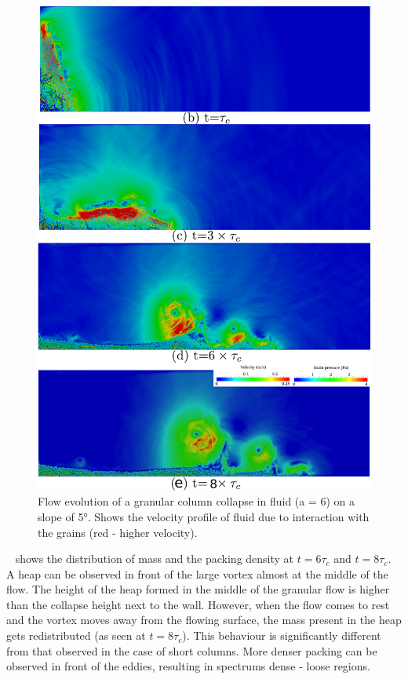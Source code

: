\documentclass[epj,twocolumn]{webofc}
\begin{document}
\begin{figure}[!h]
\centering
\includegraphics[width=0.9\linewidth]{figs/lbm_dem_a6_slope5}
\caption[Flow evolution of a granular column collapse in fluid (a = 6) on a 
slope of 5\si{\degree}]{Flow evolution of a granular column collapse in fluid 
(a = 6) on a slope of 5\si{\degree}. Shows the velocity profile of fluid due to 
interaction with the grains (red - higher velocity).}
\label{fig:a6_slope_snapshots}
\end{figure}

~ shows 
the distribution of mass and the packing density at $t = 6\tau_c$ and
$t = 8\tau_c$. A heap can be observed in front of the large vortex almost at the 
middle of the flow. The height of the heap formed in the middle of the granular 
flow is higher than the collapse height next to the wall. However, when the 
flow comes to rest and the vortex moves 
away from the flowing surface, the mass present in the heap gets redistributed 
(as seen at $t = 8\tau_c$). This behaviour is significantly different from that 
observed in the case of short columns. More denser packing can be observed in front
of the eddies, resulting in spectrums dense - loose regions.
\end{document}
